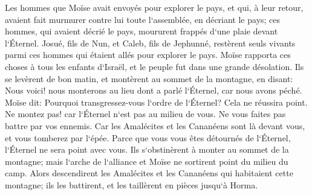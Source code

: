 \verse Les hommes que Moïse avait envoyés pour explorer le pays, et qui, à leur retour, avaient fait murmurer contre lui toute l`assemblée, en décriant le pays; 
\verse ces hommes, qui avaient décrié le pays, moururent frappés d`une plaie devant l`Éternel. 
\verse Josué, fils de Nun, et Caleb, fils de Jephunné, restèrent seuls vivants parmi ces hommes qui étaient allés pour explorer le pays. 
\verse Moïse rapporta ces choses à tous les enfants d`Israël, et le peuple fut dans une grande désolation. 
\verse Ils se levèrent de bon matin, et montèrent au sommet de la montagne, en disant: Nous voici! nous monterons au lieu dont a parlé l`Éternel, car nous avons péché. 
\verse Moïse dit: Pourquoi transgressez-vous l`ordre de l`Éternel? Cela ne réussira point. 
\verse Ne montez pas! car l`Éternel n`est pas au milieu de vous. Ne vous faites pas battre par vos ennemis. 
\verse Car les Amalécites et les Cananéens sont là devant vous, et vous tomberez par l`épée. Parce que vous vous êtes détournés de l`Éternel, l`Éternel ne sera point avec vous. 
\verse Ils s`obstinèrent à monter au sommet de la montagne; mais l`arche de l`alliance et Moïse ne sortirent point du milieu du camp. 
\verse Alors descendirent les Amalécites et les Cananéens qui habitaient cette montagne; ils les battirent, et les taillèrent en pièces jusqu`à Horma. 

